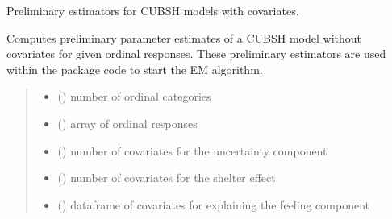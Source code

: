 \documentclass[letterpaper,10pt,english]{sphinxmanual}
\begin{document}

\begin{fulllineitems}
\label{\detokenize{cubmods:cubmods.cubsh_ywx.init_theta}}
\pysigstartsignatures
{}
\pysigstopsignatures
\sphinxAtStartPar
Preliminary estimators for CUBSH models with covariates.

\sphinxAtStartPar
Computes preliminary parameter estimates of a CUBSH model without covariates for given ordinal
responses. These preliminary estimators are used within the package code to start the E\sphinxhyphen{}M algorithm.
\begin{quote}\begin{description}
\begin{itemize}
\item {} 
\sphinxAtStartPar
{} () \textendash{} number of ordinal categories

\item {} 
\sphinxAtStartPar
{} () \textendash{} array of ordinal responses

\item {} 
\sphinxAtStartPar
{} () \textendash{} number of covariates for the uncertainty component

\item {} 
\sphinxAtStartPar
{} () \textendash{} number of covariates for the shelter effect

\item {} 
\sphinxAtStartPar
{} () \textendash{} dataframe of covariates for explaining the feeling component


\end{itemize}
\end{description}
\end{quote}
\end{fulllineitems}
\end{document}
